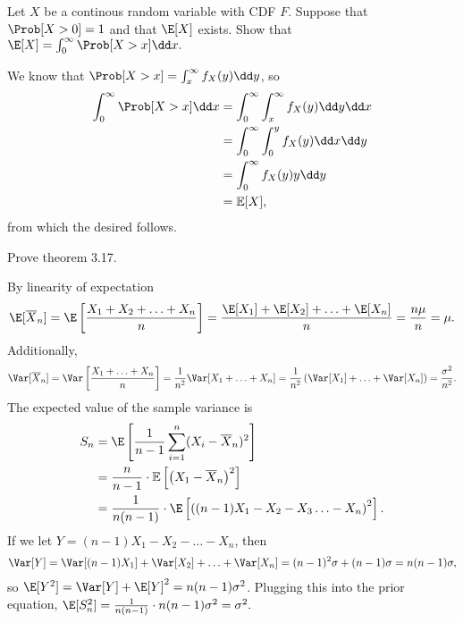 \documentclass[a4paper]{article}
\begin{document}
\begin{Exercise}
	Let $X$ be a continous random variable with CDF $F$. Suppose that $\Prob[X >0] = 1$ and that $\E[X]$ exists. Show that $\E[X] = \int_0^{\infty} \Prob[X > x] \dd x.$
\end{Exercise}
\begin{Solution}
We know that $\Prob[X > x]= \int_{x}^{\infty} f_X(y) \dd y$, so
\begin{align*}
	\int_0^{\infty} \Prob[X > x] \dd x &= \int_0^{\infty} \int_x^{\infty} f_X(y) \dd y \dd x 
					\\ &= \int_0^{\infty} \int_{0}^{y} f_X(y) \dd x \dd y
					\\ &= \int_0^{\infty} f_X(y) y \dd y
					\\ &= \mathbb{E}[X],
\end{align*}
from which the desired follows.
\end{Solution}
\begin{Exercise}
	Prove theorem 3.17.
\end{Exercise}
\begin{Solution}
	By linearity of expectation
	\begin{align*}
		\E[\overline{X}_n] = \E \left[ \frac{X_1 + X_2 + \ldots + X_n}{n} \right] = \frac{\E[X_1] + \E[X_2] + \ldots + \E[X_n]}{n} = \frac{n \mu}{n} = \mu.
	\end{align*}
	Additionally,
	\begin{align*}
		\Var[\overline{X}_n] = \Var \left[ \frac{X_1 + \ldots + X_n}{n} \right] = \frac{1}{n^2} \Var[X_1 + \ldots + X_n] = \frac{1}{n^2} \left( \Var[X_1] + \ldots + \Var[X_n] \right) = \frac{\sigma^2}{n^2}.
	\end{align*}
	The expected value of the sample variance is
	\begin{align*}
		S_n &= \E \left[ \frac{1}{n - 1} \sum_{i = 1}^n (X_i - \overline{X}_n)^2 \right]
		 \\ &= \frac{n}{n - 1} \cdot \mathbb{E}\left[ \left( X_1 - \overline{X}_n \right)^2 \right]
		 \\ &= \frac{1}{n(n - 1)}\cdot \E \left[ \left( (n - 1)X_1 - X_2 - X_3\ldots - X_n \right)^2 \right].
	\end{align*}
	If we let $Y = (n - 1)X_1 - X_2 - \ldots - X_n$, then 
	\begin{align*}
		\Var[Y] = \Var[(n - 1)X_1] + \Var[X_2] + \ldots + \Var[X_n] = (n - 1)^2 \sigma + (n - 1) \sigma = n (n - 1) \sigma,
	\end{align*}
	so $\E[Y^2] = \Var[Y] + \E[Y]^2 = n (n - 1) \sigma^2$. Plugging this into the prior equation, $\E[S_n^2] = \frac{1}{n (n - 1)} \cdot n(n -1)\sigma^2 = \sigma^2.$
\end{Solution}
\end{document}
